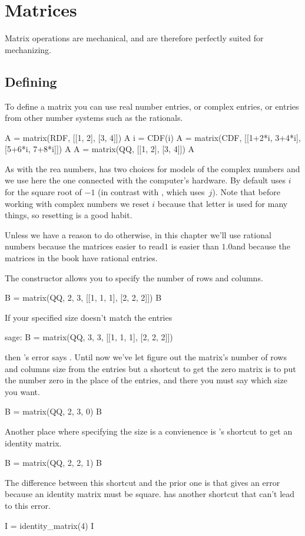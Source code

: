 \chapter{Matrices}

Matrix operations are mechanical, and are therefore perfectly suited for 
mechanizing.



\section{Defining}
To define a matrix 
you can use real number entries, or complex entries, or 
entries from other number systems such as the rationals. 
\begin{sageoutput}
A = matrix(RDF, [[1, 2], [3, 4]])
A
i = CDF(i)
A = matrix(CDF, [[1+2*i, 3+4*i], [5+6*i, 7+8*i]])
A
A = matrix(QQ, [[1, 2], [3, 4]])
A                               
\end{sageoutput}
\noindent
As with the rea numbers, \Sage{} has two choices for models of the complex
numbers and we use here the one connected with the computer's hardware.
By default \Sage{} uses $i$ for the square root of $-1$ (in contrast with 
\python, which uses~$j$).
Note that before working with complex numbers we reset 
$i$ because that letter is used for many things, so 
resetting is a good habit.

Unless we have a reason to do otherwise, in this chapter
we'll use rational numbers because the matrices easier to 
read\Dash $1$ is easier than $1.0$\Dash and 
because the matrices in the book have rational entries.

The  constructor allows you to specify the number of
rows and columns.
\begin{sageoutput}
B = matrix(QQ, 2, 3, [[1, 1, 1], [2, 2, 2]])  
B
\end{sageoutput}
\noindent
If your specified size doesn't match the entries 
\begin{sageoutput}
sage: B = matrix(QQ, 3, 3, [[1, 1, 1], [2, 2, 2]])  
\end{sageoutput}
\noindent
then \Sage's error says
.
Until now we've let \Sage{} figure out the matrix's 
number of rows and columns size from the entries but
a shortcut to get the zero matrix 
is to put the number zero in the place of the entries, and there you
must say which size you want.
\begin{sageoutput}
B = matrix(QQ, 2, 3, 0)                     
B
\end{sageoutput}
\noindent
Another place where specifying the size is a convienence is 
\Sage's shortcut to get an identity matrix.
\begin{sageoutput}
B = matrix(QQ, 2, 2, 1)
B
\end{sageoutput}
\noindent
The difference between this shortcut and the prior one is that 
 gives an error because 
an identity matrix must be square.
\Sage{} has another shortcut that can't lead to this error.
\begin{sageoutput}
I = identity_matrix(4)
I
\end{sageoutput}


